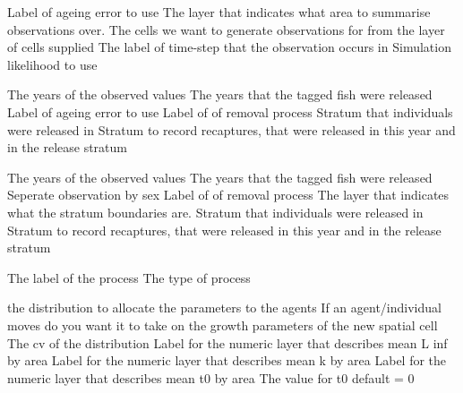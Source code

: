  {Label of ageing error to use}
 {The layer that indicates what area to summarise observations over.}
 {The cells we want to generate observations for from the layer of cells supplied}
 {The label of time-step that the observation occurs in}
 {Simulation likelihood to use}
\par\textbf{}\par
{} {The years of the observed values}
 {The years that the tagged fish were released}
 {Label of ageing error to use}
 {Label of of removal process}
 {Stratum that individuals were released in}
 {Stratum to record recaptures, that were released in this year and in the release stratum}
\par\textbf{}\par
{} {The years of the observed values}
 {The years that the tagged fish were released}
 {Seperate observation by sex}
 {Label of of removal process}
 {The layer that indicates what the stratum boundaries are.}
 {Stratum that individuals were released in}
 {Stratum to record recaptures, that were released in this year and in the release stratum}
\par\par
{} {The label of the process}
 {The type of process}
\par\textbf{}\par
{} {the distribution to allocate the parameters to the agents}
 {If an agent/individual moves do you want it to take on the growth parameters of the new spatial cell}
 {The cv of the distribution}
 {Label for the numeric layer that describes mean L inf by area}
 {Label for the numeric layer that describes mean k by area}
 {Label for the numeric layer that describes mean t0 by area}
 {The value for t0 default = 0}
